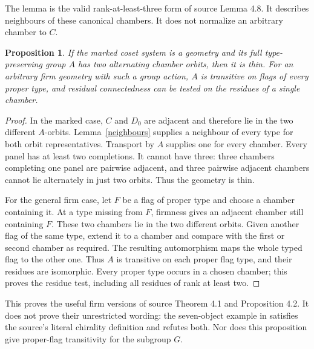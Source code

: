 \documentclass[11pt]{article}
\newtheorem{proposition}[theorem]{Proposition}
\begin{document}
The lemma is the valid rank-at-least-three form of source Lemma 4.8.
It describes neighbours of these canonical chambers. It does not
normalize an arbitrary chamber to $C$.

\begin{proposition}\label{firmchiral}
If the marked coset system is a geometry and its full type-preserving
group $A$ has two alternating chamber orbits, then it is thin.
For an arbitrary firm geometry with such a group action, $A$ is
transitive on flags of every proper type, and residual connectedness
can be tested on the residues of a single chamber.
\end{proposition}
\begin{proof}
In the marked case, $C$ and $D_0$ are adjacent and therefore lie
in the two different $A$-orbits. Lemma~\ref{neighbours} supplies
a neighbour of every type for both orbit representatives. Transport
by $A$ supplies one for every chamber. Every panel has at least
two completions. It cannot have three: three chambers completing
one panel are pairwise adjacent, and three pairwise adjacent
chambers cannot lie alternately in just two orbits. Thus the
geometry is thin.

For the general firm case, let $F$ be a flag of proper type and
choose a chamber containing it. At a type missing from $F$,
firmness gives an adjacent chamber still containing $F$. These
two chambers lie in the two different orbits. Given another flag
of the same type, extend it to a chamber and compare with the
first or second chamber as required. The resulting automorphism
maps the whole typed flag to the other one. Thus $A$ is transitive
on each proper flag type, and their residues are isomorphic.
Every proper type occurs in a chosen chamber; this proves the
residue test, including all residues of rank at least two.
\end{proof}

This proves the useful firm versions of source Theorem 4.1 and
Proposition 4.2. It does not prove their unrestricted wording:
the seven-object example in \cite{CF} satisfies the source's
literal chirality definition and refutes both. Nor does this
proposition give proper-flag transitivity for the subgroup $G$.
\end{document}
